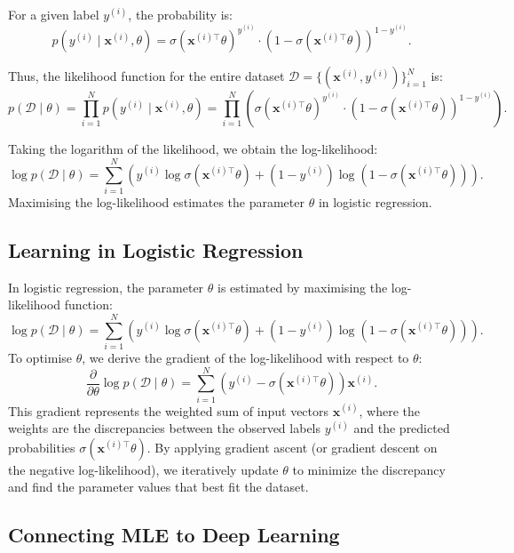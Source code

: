 For a given label \( y^{(i)} \), the probability is:
\[
    p(y^{(i)} \mid \boldsymbol{x}^{(i)}, \theta) = \sigma(\boldsymbol{x}^{(i)\top}\theta)^{y^{(i)}} \cdot (1 - \sigma(\boldsymbol{x}^{(i)\top}\theta))^{1 - y^{(i)}}.
\]

Thus, the likelihood function for the entire dataset \( \mathcal{D} = \{(\boldsymbol{x}^{(i)}, y^{(i)})\}_{i=1}^{N} \) is:
\[
    p(\mathcal{D} \mid \theta) = \prod_{i=1}^{N} p(y^{(i)} \mid \boldsymbol{x}^{(i)}, \theta) = \prod_{i=1}^{N} \left( \sigma(\boldsymbol{x}^{(i)\top}\theta)^{y^{(i)}} \cdot (1 - \sigma(\boldsymbol{x}^{(i)\top}\theta))^{1 - y^{(i)}} \right).
\]

Taking the logarithm of the likelihood, we obtain the log-likelihood:
\[
    \log p(\mathcal{D} \mid \theta) = \sum_{i=1}^{N} \left( y^{(i)} \log \sigma(\boldsymbol{x}^{(i)\top}\theta) + (1 - y^{(i)}) \log (1 - \sigma(\boldsymbol{x}^{(i)\top}\theta)) \right).
\]
Maximising the log-likelihood estimates the parameter \( \theta \) in logistic regression.

\subsection{Learning in Logistic Regression}

In logistic regression, the parameter \( \theta \) is estimated by maximising the log-likelihood function:
\[
    \log p(\mathcal{D} \mid \theta) = \sum_{i=1}^{N} \left( y^{(i)} \log \sigma(\boldsymbol{x}^{(i)\top}\theta) + (1 - y^{(i)}) \log (1 - \sigma(\boldsymbol{x}^{(i)\top}\theta)) \right).
\]
To optimise \( \theta \), we derive the gradient of the log-likelihood with respect to \( \theta \):
\[
    \frac{\partial}{\partial \theta} \log p(\mathcal{D} \mid \theta) = \sum_{i=1}^{N} \left( y^{(i)} - \sigma(\boldsymbol{x}^{(i)\top}\theta) \right) \boldsymbol{x}^{(i)}.
\]
This gradient represents the weighted sum of input vectors \( \boldsymbol{x}^{(i)} \), where the weights are the discrepancies between the observed labels \( y^{(i)} \) and the predicted probabilities \( \sigma(\boldsymbol{x}^{(i)\top}\theta) \). By applying gradient ascent (or gradient descent on the negative log-likelihood), we iteratively update \( \theta \) to minimize the discrepancy and find the parameter values that best fit the dataset.

\subsection{Connecting MLE to Deep Learning}

